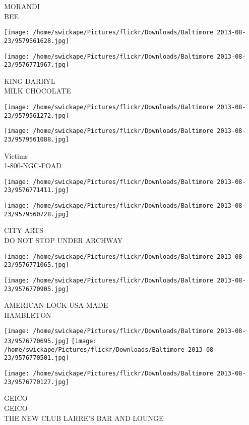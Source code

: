 \documentclass[10pt,letterpaper]{article}
\begin{document}
MORANDI\\
BEE
\pagebreak

\texttt{[image: /home/swickape/Pictures/flickr/Downloads/Baltimore 2013-08-23/9579561628.jpg]}

\vspace{0.25in}
\texttt{[image: /home/swickape/Pictures/flickr/Downloads/Baltimore 2013-08-23/9576771967.jpg]}

KING DARRYL\\
MILK CHOCOLATE
\pagebreak

\texttt{[image: /home/swickape/Pictures/flickr/Downloads/Baltimore 2013-08-23/9579561272.jpg]}

\vspace{0.25in}
\texttt{[image: /home/swickape/Pictures/flickr/Downloads/Baltimore 2013-08-23/9579561088.jpg]}

Victims\\
1{-}800{-}NGC{-}FOAD
\pagebreak

\texttt{[image: /home/swickape/Pictures/flickr/Downloads/Baltimore 2013-08-23/9576771411.jpg]}

\vspace{0.25in}
\texttt{[image: /home/swickape/Pictures/flickr/Downloads/Baltimore 2013-08-23/9579560728.jpg]}

CITY ARTS\\
DO NOT STOP UNDER ARCHWAY
\pagebreak

\texttt{[image: /home/swickape/Pictures/flickr/Downloads/Baltimore 2013-08-23/9576771065.jpg]}

\vspace{0.25in}
\texttt{[image: /home/swickape/Pictures/flickr/Downloads/Baltimore 2013-08-23/9576770905.jpg]}

AMERICAN LOCK USA MADE\\
HAMBLETON
\pagebreak

\texttt{[image: /home/swickape/Pictures/flickr/Downloads/Baltimore 2013-08-23/9576770695.jpg]}
\texttt{[image: /home/swickape/Pictures/flickr/Downloads/Baltimore 2013-08-23/9576770501.jpg]}

\vspace{0.25in}
\texttt{[image: /home/swickape/Pictures/flickr/Downloads/Baltimore 2013-08-23/9576770127.jpg]}

GEICO\\
GEICO\\
THE NEW CLUB LARRE'S BAR AND LOUNGE
\pagebreak
\end{document}
